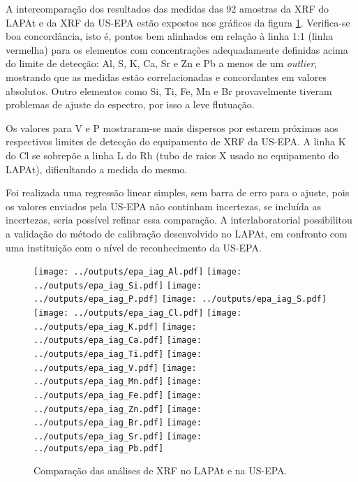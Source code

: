 A intercomparação dos resultados das medidas das 92 amostras da XRF do LAPAt e 
da XRF da US-EPA estão expostos nos gráficos da figura \ref{fig:epa_lapat}. 
Verifica-se boa concordância, isto é, pontos bem alinhados
em relação à linha 1:1 (linha vermelha) para os elementos com 
concentrações adequadamente definidas acima do limite de detecção: Al, S, 
K, Ca, Sr e Zn e Pb a menos de um \textit{outlier}, mostrando que as medidas 
estão correlacionadas e concordantes em valores absolutos. Outro elementos como
Si, Ti, Fe, Mn e Br provavelmente tiveram problemas de ajuste do espectro, por 
isso a leve flutuação. 

Os valores para V e P mostraram-se mais dispersos por estarem próximos aos 
respectivos limites de detecção do equipamento de XRF da US-EPA. A linha K do Cl 
se sobrepõe a linha L do Rh (tubo de raios X usado no equipamento do LAPAt), 
dificultando a medida do mesmo.   

Foi realizada uma regressão linear simples, sem barra de erro para o ajuste, 
pois os valores enviados pela US-EPA não continham incertezas, se incluída as 
incertezas, seria possível refinar essa comparação.  A interlaboratorial 
possibilitou a validação do método de 
calibração desenvolvido no LAPAt, em confronto com uma instituição com o nível 
de reconhecimento da US-EPA.

\newpage
\begin{figure}[H]
  \centering
    \texttt{[image: ../outputs/epa\_iag\_Al.pdf]}
    \texttt{[image: ../outputs/epa\_iag\_Si.pdf]}
    \texttt{[image: ../outputs/epa\_iag\_P.pdf]}
    \texttt{[image: ../outputs/epa\_iag\_S.pdf]}
    \texttt{[image: ../outputs/epa\_iag\_Cl.pdf]}
    \texttt{[image: ../outputs/epa\_iag\_K.pdf]}
    \texttt{[image: ../outputs/epa\_iag\_Ca.pdf]}
    \texttt{[image: ../outputs/epa\_iag\_Ti.pdf]}
    \texttt{[image: ../outputs/epa\_iag\_V.pdf]}
    \texttt{[image: ../outputs/epa\_iag\_Mn.pdf]}
    \texttt{[image: ../outputs/epa\_iag\_Fe.pdf]}
    \texttt{[image: ../outputs/epa\_iag\_Zn.pdf]}
    \texttt{[image: ../outputs/epa\_iag\_Br.pdf]}
    \texttt{[image: ../outputs/epa\_iag\_Sr.pdf]}
    \texttt{[image: ../outputs/epa\_iag\_Pb.pdf]}
  \caption{Comparação das análises de XRF no LAPAt e na US-EPA. 
           \label{fig:epa_lapat}}
\end{figure}
